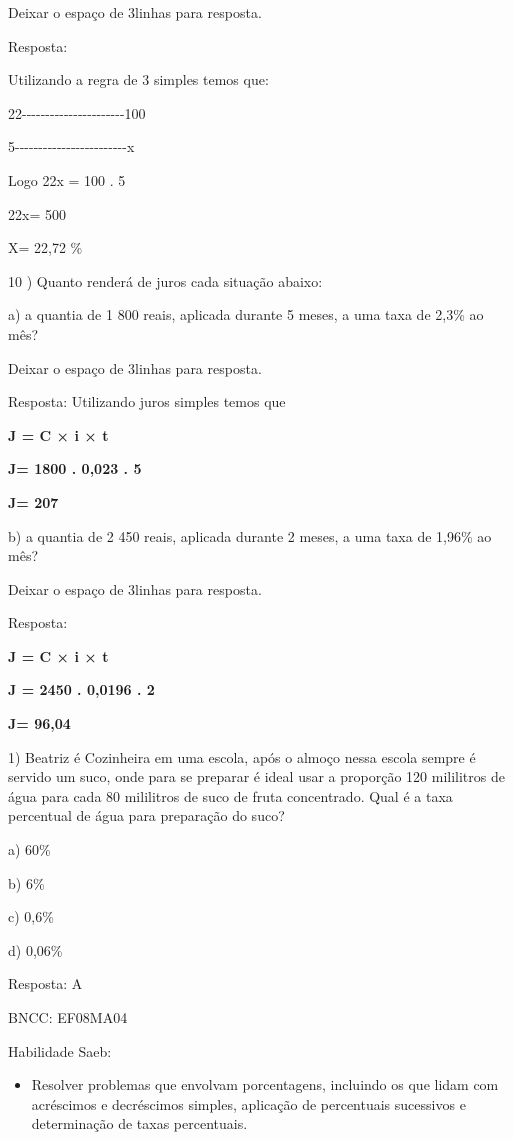 Deixar o espaço de 3linhas para resposta.

Resposta:

Utilizando a regra de 3 simples temos que:

22-\/-\/-\/-\/-\/-\/-\/-\/-\/-\/-\/-\/-\/-\/-\/-\/-\/-\/-\/-\/-\/-100

5-\/-\/-\/-\/-\/-\/-\/-\/-\/-\/-\/-\/-\/-\/-\/-\/-\/-\/-\/-\/-\/-\/-\/-x

Logo 22x = 100 . 5

22x= 500

X= 22,72 \%

10 ) Quanto renderá de juros cada situação abaixo:

a) a quantia de 1 800 reais, aplicada durante 5 meses, a uma taxa de
2,3\% ao mês?

Deixar o espaço de 3linhas para resposta.

Resposta: Utilizando juros simples temos que

\textbf{J = C × i × t}

\textbf{J= 1800 . 0,023 . 5}

\textbf{J= 207}

b) a quantia de 2 450 reais, aplicada durante 2 meses, a uma taxa de
1,96\% ao mês?

Deixar o espaço de 3linhas para resposta.

Resposta:

\textbf{J = C × i × t}

\textbf{J = 2450 . 0,0196 . 2}

\textbf{J= 96,04}


1) Beatriz é Cozinheira em uma escola, após o almoço nessa escola sempre
é servido um suco, onde para se preparar é ideal usar a proporção 120
mililitros de água para cada 80 mililitros de suco de fruta concentrado.
Qual é a taxa percentual de água para preparação do suco?

a) 60\%

b) 6\%

c) 0,6\%

d) 0,06\%

Resposta: A

BNCC: EF08MA04

Habilidade Saeb:

\begin{itemize}
\tightlist
\item
  Resolver problemas que envolvam porcentagens, incluindo os que lidam
  com acréscimos e decréscimos simples, aplicação de percentuais
  sucessivos e determinação de taxas percentuais.
\end{itemize}

